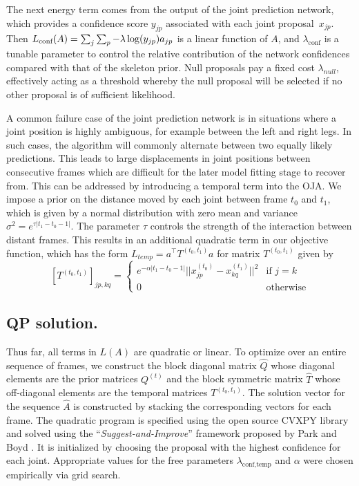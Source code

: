 The next energy term comes from the output of the joint prediction network, which provides a confidence score $y_{jp}$ associated with each joint proposal~$x_{jp}$.  Then $L_{\textrm{conf}}(A) = \sum_j\sum_p -\lambda\log(y_{jp}) a_{jp}$ is a linear function of $A$, 
and $\lambda_{\text{conf}}$ is a tunable parameter to control the relative contribution of the network confidences compared with that of the skeleton prior.
Null proposals pay a fixed cost $\lambda_{null}$, effectively acting as a threshold whereby the null proposal will be selected if no other proposal is of sufficient likelihood. 

A common failure case of the joint prediction network is in situations where a joint position is highly ambiguous, for example between the left and right legs. In such cases, the algorithm will commonly alternate between two equally likely predictions. This leads to large displacements in joint positions between consecutive frames which are difficult for the later model fitting stage to recover from. This can be addressed by introducing a temporal term into the OJA. We impose a prior on the distance moved by each joint between frame $t_0$ and $t_1$, which is given by a normal distribution with zero mean and variance $\sigma^{2} =e^{\tau|t_1 - t_0 - 1|}$. 
The parameter $\tau$ controls the strength of the interaction between distant frames. This results in an additional quadratic term in our objective function, which has the form $L_{temp} = a^\top T^{(t_0, t_1)} a$ for matrix $T^{(t_0, t_1)}$ given by 
\begin{equation}
\left[T^{(t_0, t_1)}\right]_{jp, kq} = \begin{cases}
e^{-\alpha|t_1 - t_0 - 1|}||x^{(t_0)}_{jp} - x^{(t_1)}_{kq}||^2 & \text{if } j=k\\
0 & \text{otherwise}
\end{cases}
\end{equation}

\subsection{QP solution.}
Thus far, all terms in $L(A)$ are quadratic or linear.
To optimize over an entire sequence of frames, we construct the block diagonal matrix $\hat{Q}$ whose diagonal elements are the prior matrices $Q^{(t)}$ and the block symmetric matrix $\hat{T}$ whose off-diagonal elements are the temporal matrices $T^{(t_0, t_1)}$. The solution vector for the sequence $\hat{A}$ is constructed by stacking the corresponding vectors for each frame. The quadratic program is specified using the open source CVXPY library \cite{diamond2016cvxpy} and solved using the ``\emph{Suggest-and-Improve}'' framework proposed by Park and Boyd \cite{park2017general}. It is initialized by choosing the proposal with the highest confidence for each joint. Appropriate values for the free parameters $\lambda_{\text{conf}, \text{temp}}$ and $\alpha$ were chosen empirically via grid search. 

